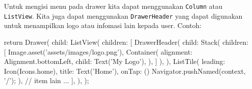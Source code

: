 \documentclass[a4paper,11pt]{article} %
\newcommand{\txtinline}[1]{\texttt{#1}}
\begin{document}
Untuk mengisi menu pada drawer kita dapat menggunakan \txtinline{Column} atau
\txtinline{ListView}. Kita juga dapat menggunakan \txtinline{DrawerHeader} yang
dapat digunakan untuk menampilkan logo atau infomasi lain kepada user.
Contoh:
\begin{dartcode}
return Drawer(
  child: ListView(
    children: [
      DrawerHeader(
        child: Stack(
          children: [
            Image.asset('assets/images/logo.png'),
            Container(
              alignment: Alignment.bottomLeft,
              child: Text('My Logo'),
            ),
          ]
        ),
      ),
      ListTile(
        leading: Icon(Icons.home),
        title: Text('Home'),
        onTap: () {
          Navigator.pushNamed(context, '/');
        }
      ),
      // item lain ...
    ],
  ),
);
\end{dartcode}
\end{document}
